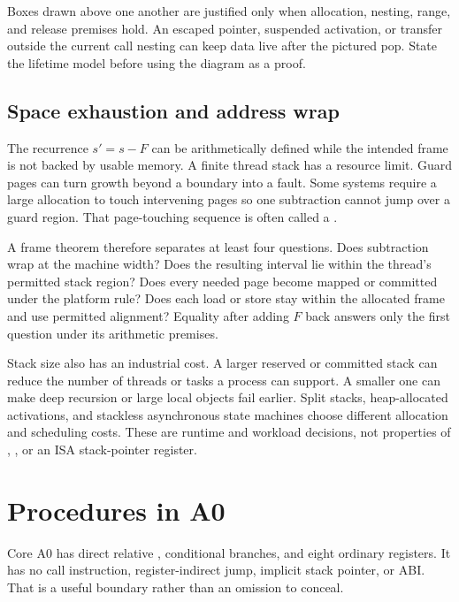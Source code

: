 \begin{warning}[title={A stack diagram is a theorem about lifetimes}]
Boxes drawn above one another are justified only when allocation, nesting,
range, and release premises hold. An escaped pointer, suspended activation, or
transfer outside the current call nesting can keep data live after the pictured pop. State the lifetime
model before using the diagram as a proof.
\end{warning}

\subsection{Space exhaustion and address wrap}

The recurrence \(s'=s-F\) can be arithmetically defined while the intended
frame is not backed by usable memory. A finite thread stack has a resource
limit. Guard pages can turn growth beyond a boundary into a fault. Some systems
require a large allocation to touch intervening pages so one subtraction cannot
jump over a guard region. That page-touching sequence is often called a
.

A frame theorem therefore separates at least four questions. Does subtraction
wrap at the machine width? Does the resulting interval lie within the thread's
permitted stack region? Does every needed page become mapped or committed under
the platform rule? Does each load or store stay within the allocated frame and
use permitted alignment? Equality after adding \(F\) back answers only the
first question under its arithmetic premises.

Stack size also has an industrial cost. A larger reserved or committed stack
can reduce the number of threads or tasks a process can support. A smaller one
can make deep recursion or large local objects fail earlier. Split stacks,
heap-allocated activations, and stackless asynchronous state machines choose
different allocation and scheduling costs. These are runtime and workload
decisions, not properties of , , or an ISA stack-pointer
register.

\section{Procedures in A0}

Core A0 has direct relative , conditional branches, and eight
ordinary registers. It has no call instruction, register-indirect jump,
implicit stack pointer, or ABI. That is a useful boundary rather than an
omission to conceal.

